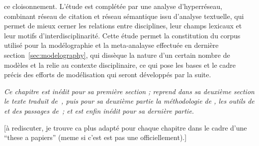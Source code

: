 ce cloisonnement. L'étude est complétée par une analyse d'hyperréseau, combinant réseau de citation et réseau sémantique issu d'analyse textuelle, qui permet de mieux cerner les relations entre disciplines, leur champs lexicaux et leur motifs d'interdisciplinarité. Cette étude permet la constitution du corpus utilisé pour la modélographie et la meta-analayse effectuée en dernière section~\ref{sec:modelography}, qui dissèque la nature d'un certain nombre de modèles et la relie au contexte disciplinaire, ce qui pose les bases et le cadre précis des efforts de modélisation qui seront développés par la suite.






\stars


\textit{Ce chapitre est inédit pour sa première section ; reprend dans sa deuxième section le texte traduit de~\cite{raimbault2015models}, puis pour sa deuxième partie la méthodologie de \cite{raimbault2016indirect}, les outils de \cite{bergeaud2017classifying} et des passages de~\cite{}; et est enfin inédit pour sa dernière partie.}

[à rediscuter, je trouve ca plus adapté pour chaque chapitre dans le cadre d'une ``these a papiers'' (meme si c'est est pas une officiellement).]






